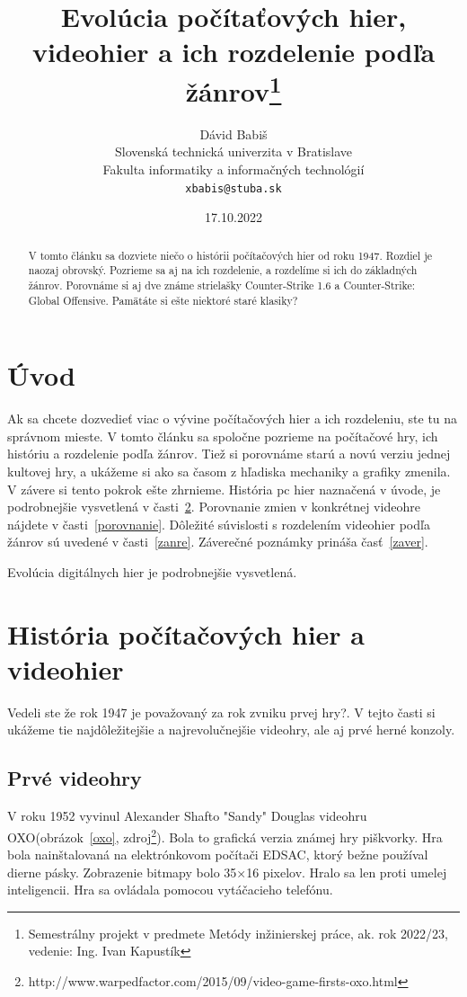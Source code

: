 \documentclass[10pt,oneside,slovak,a4paper]{article}
\title{Evolúcia počítaťových hier, videohier a ich rozdelenie podľa žánrov\thanks{Semestrálny projekt v predmete Metódy inžinierskej práce, ak. rok 2022/23, vedenie: Ing. Ivan Kapustík}} %
\author{Dávid Babiš\\[2pt]
	{\small Slovenská technická univerzita v Bratislave}\\
	{\small Fakulta informatiky a informačných technológií}\\
	{\small \texttt{xbabis@stuba.sk}}
	}
\date{\small 17.10.2022}
\begin{document}
\maketitle

\begin{abstract}
 V tomto článku sa dozviete niečo o histórii počítačových hier od roku 1947. Rozdiel je naozaj obrovský. Pozrieme sa aj na ich rozdelenie, a rozdelíme si ich do základných žánrov. Porovnáme si aj dve známe strielašky Counter-Strike 1.6 a Counter-Strike: Global Offensive. Pamätáte si ešte niektoré staré klasiky?
\end{abstract}



\section{Úvod}
Ak sa chcete dozvedieť viac o vývine počítačových hier a ich rozdeleniu, ste tu na správnom mieste. V tomto článku sa spoločne pozrieme na počítačové hry, ich históriu a rozdelenie podľa žánrov. Tiež si porovnáme starú a novú verziu jednej kultovej hry, a ukážeme si ako sa časom z hľadiska mechaniky a grafiky zmenila. V závere si tento pokrok ešte zhrnieme. História pc hier naznačená v úvode, je podrobnejšie vysvetlená v časti~\ref{historia}. Porovnanie zmien v konkrétnej videohre nájdete v časti~\ref{porovnanie}. 
Dôležité súvislosti s rozdelením videohier podľa žánrov sú uvedené v časti~\ref{zanre}.
Záverečné poznámky prináša časť~\ref{zaver}.

Evolúcia digitálnych hier je podrobnejšie vysvetlená\cite{sahay}.

\section{História počítačových hier a videohier} \label{historia}
Vedeli ste že rok 1947 je považovaný za rok zvniku prvej hry?. V tejto časti si ukážeme tie najdôležitejšie a najrevolučnejšie videohry, ale aj prvé herné konzoly.

\subsection{Prvé videohry}

V roku 1952 vyvinul Alexander Shafto "Sandy" Douglas videohru OXO(obrázok~\ref{oxo}, zdroj\footnote{http://www.warpedfactor.com/2015/09/video-game-firsts-oxo.html}). Bola to grafická verzia známej hry piškvorky. Hra bola nainštalovaná na elektrónkovom počítači EDSAC, ktorý bežne používal dierne pásky. Zobrazenie bitmapy bolo 35×16 pixelov. Hralo sa len proti umelej inteligencii. Hra sa ovládala pomocou vytáčacieho telefónu.
\end{document}

